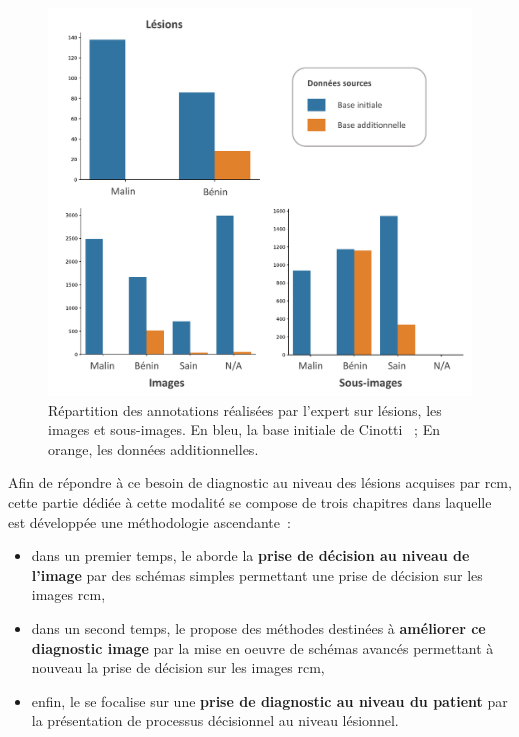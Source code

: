 \begin{figure}[H]
    \begin{center}
        \includegraphics[width=0.8\linewidth]{contents/ii_preamble_microscopy/resources/scheme_rcm_statistics.pdf}
        \caption{Répartition des annotations réalisées par l'expert sur lésions, les images et sous-images. En bleu, la base initiale de Cinotti~\cite{Cinotti2018} ; En orange, les données additionnelles.}
        \label{fig:scheme_rcm_statistics}
    \end{center} 
\end{figure}\par

Afin de répondre à ce besoin de diagnostic au niveau des lésions acquises par \gls{rcm}, cette partie dédiée à cette modalité se compose de trois chapitres dans laquelle est développée une méthodologie ascendante~:
\begin{itemize}
    \item dans un premier temps, le  aborde la \textbf{prise de décision au niveau de l'image} par des schémas simples permettant une prise de décision sur les images \gls{rcm},
    \item dans un second temps, le  propose des méthodes destinées à \textbf{améliorer ce diagnostic image} par la mise en oeuvre de schémas avancés permettant à nouveau la prise de décision sur les images \gls{rcm},
    \item enfin, le  se focalise sur une \textbf{prise de diagnostic au niveau du patient} par la présentation de processus décisionnel au niveau lésionnel.
\end{itemize}\par
\newpage